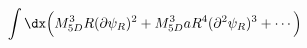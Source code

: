 \begin{equation}
\int \dx \Big( M_{5D}^3 R  (\partial \psi_R)^2 
+ M_{5D}^3 a R^4 (\partial^2 \psi_R)^3 + \cdots \Big)
\end{equation}

